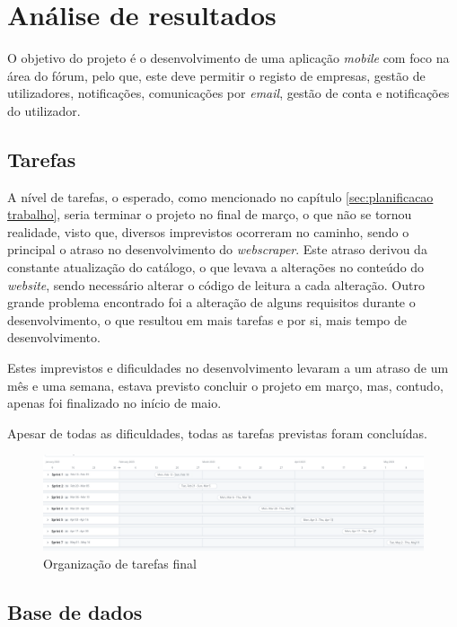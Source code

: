 \chapter{Análise de resultados}
 O objetivo do projeto é o desenvolvimento de uma aplicação \textit{mobile} com foco na área do fórum, pelo que, este deve permitir o registo de empresas, gestão de utilizadores, notificações, comunicações por \textit{email}, gestão de conta e notificações do utilizador.



 \section{Tarefas}

A nível de tarefas, o esperado, como mencionado no capítulo \ref{sec:planificacao trabalho}, seria terminar o projeto no final de março, o que não se tornou realidade, visto que, diversos imprevistos ocorreram no caminho, sendo o principal o atraso no desenvolvimento do \textit{webscraper}. Este atraso derivou da constante atualização do catálogo, o que levava a alterações no conteúdo do \textit{website}, sendo necessário alterar o código de leitura a cada alteração. Outro grande problema encontrado foi a alteração de alguns requisitos durante o desenvolvimento, o que resultou em mais tarefas e por si, mais tempo de desenvolvimento.

Estes imprevistos e dificuldades no desenvolvimento levaram a um atraso de um mês e uma semana, estava previsto concluir o projeto em março, mas, contudo, apenas foi finalizado no início de maio.

Apesar de todas as dificuldades, todas as tarefas previstas foram concluídas.

\begin{figure}[htb]
  \centering
  \includegraphics[width=\textwidth]{images/analise_resultados/planeamento_final.png}
  \caption{Organização de tarefas final}
  \label{fig:78}
\end{figure}

\newpage

\section{Base de dados}


